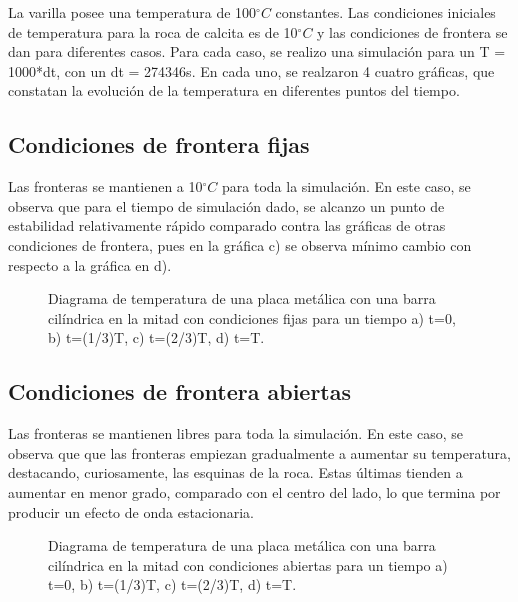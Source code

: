 \documentclass{article}
\begin{document}
La varilla posee una temperatura de 100$^{\circ}C$ constantes. Las condiciones iniciales de temperatura para la roca de calcita es de 10$^{\circ}C$ y las condiciones de frontera se dan para diferentes casos. Para cada caso, se realizo una simulación para un T = 1000*dt, con un dt = 274346s. En cada uno, se realzaron 4 cuatro gráficas, que constatan la evolución de la temperatura en diferentes puntos del tiempo.

\subsection*{Condiciones de frontera fijas}

Las fronteras se mantienen a 10$^{\circ}C$ para toda la simulación. En este caso, se observa que para el tiempo de simulación dado, se alcanzo un punto de estabilidad relativamente rápido comparado contra las gráficas de otras condiciones de frontera, pues en la gráfica c) se observa mínimo cambio con respecto a la gráfica en d).
\begin{figure}[H]
    \centering
    \caption{Diagrama de temperatura de una placa metálica con una barra cilíndrica en la mitad con condiciones fijas para un tiempo a) t=0, b) t=(1/3)T, c) t=(2/3)T, d) t=T.}
    \label{fig:CondicionesFijasTemp}
\end{figure}
\subsection*{Condiciones de frontera abiertas}
Las fronteras se mantienen libres para toda la simulación. En este caso, se observa que que las fronteras empiezan gradualmente a aumentar su temperatura, destacando, curiosamente, las esquinas de la roca. Estas últimas tienden a aumentar en menor grado, comparado con el centro del lado, lo que termina por producir un efecto de onda estacionaria.
\begin{figure}[H]
    \centering
    \caption{Diagrama de temperatura de una placa metálica con una barra cilíndrica en la mitad con condiciones abiertas para un tiempo a) t=0, b) t=(1/3)T, c) t=(2/3)T, d) t=T.}
    \label{fig:CondicionesFijasTemp}
\end{figure}
\end{document}
